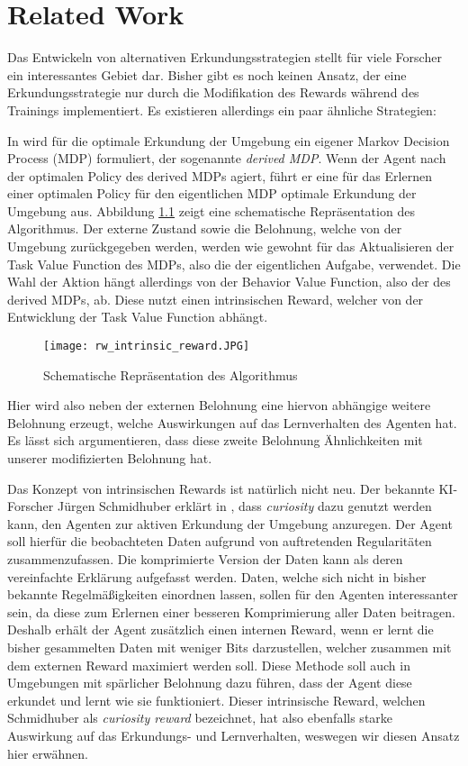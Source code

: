 \chapter{Related Work} \label{sec:relatedWork}
Das Entwickeln von alternativen Erkundungsstrategien stellt für viele Forscher ein interessantes Gebiet dar. Bisher gibt es noch keinen Ansatz, der eine Erkundungsstrategie nur durch die Modifikation des Rewards während des Trainings implementiert. Es existieren allerdings ein paar ähnliche Strategien:

In \cite{r09_csimcsek2006intrinsic} wird für die optimale Erkundung der Umgebung ein eigener Markov Decision Process (MDP) formuliert, der sogenannte \textit{derived MDP}. Wenn der Agent nach der optimalen Policy des derived MDPs agiert, führt er eine für das Erlernen einer optimalen Policy für den eigentlichen MDP optimale Erkundung der Umgebung aus. Abbildung \ref{img:rwIntrinsicReward} zeigt eine schematische Repräsentation des Algorithmus. Der externe Zustand sowie die Belohnung, welche von der Umgebung zurückgegeben werden, werden wie gewohnt für das Aktualisieren der Task Value Function des MDPs, also die der eigentlichen Aufgabe, verwendet. Die Wahl der Aktion hängt allerdings von der Behavior Value Function, also der des derived MDPs, ab. Diese nutzt einen intrinsischen Reward, welcher von der Entwicklung der Task Value Function abhängt.
\begin{figure}[h!]
    \centering
    \texttt{[image: rw\_intrinsic\_reward.JPG]}
    \caption{Schematische Repräsentation des Algorithmus} \label{img:rwIntrinsicReward}
\end{figure}
Hier wird also neben der externen Belohnung eine hiervon abhängige weitere Belohnung erzeugt, welche Auswirkungen auf das Lernverhalten des Agenten hat. Es lässt sich argumentieren, dass diese zweite Belohnung Ähnlichkeiten mit unserer modifizierten Belohnung hat.

Das Konzept von intrinsischen Rewards ist natürlich nicht neu. Der bekannte KI-Forscher Jürgen Schmidhuber erklärt in \cite{r01_schmidhuber2009driven}, dass \textit{curiosity} dazu genutzt werden kann, den Agenten zur aktiven Erkundung der Umgebung anzuregen. Der Agent soll hierfür die beobachteten Daten aufgrund von auftretenden Regularitäten zusammenzufassen. Die komprimierte Version der Daten kann als deren vereinfachte Erklärung aufgefasst werden. Daten, welche sich nicht in bisher bekannte Regelmäßigkeiten einordnen lassen, sollen für den Agenten interessanter sein, da diese zum Erlernen einer besseren Komprimierung aller Daten beitragen. Deshalb erhält der Agent zusätzlich einen internen Reward, wenn er lernt die bisher gesammelten Daten mit weniger Bits darzustellen, welcher zusammen mit dem externen Reward maximiert werden soll. Diese Methode soll auch in Umgebungen mit spärlicher Belohnung dazu führen, dass der Agent diese erkundet und lernt wie sie funktioniert. Dieser intrinsische Reward, welchen Schmidhuber als \textit{curiosity reward} bezeichnet, hat also ebenfalls starke Auswirkung auf das Erkundungs- und Lernverhalten, weswegen wir diesen Ansatz hier erwähnen.

